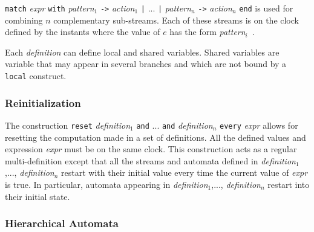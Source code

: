 \documentclass[11pt,titlepage,twoside]{report}
\newcommand{\And}{\mbox{{\tt and}}}
\renewcommand{\Reset}{\mbox{{\tt reset}}}
\newcommand{\Every}{\mbox{{\tt every}}}
\newcommand{\term}[1]{{\tt #1}}
\newcommand{\nterm}[1]{{\em #1}}
\begin{document}
\term{match} \nterm{expr} \term{with} \nterm{pattern}$_1$ \term{->}
\nterm{action}$_1$ \term{|} ... \term{|} \nterm{pattern}$_n$ \term{->}
\nterm{action}$_n$ \term{end} is used for combining $n$ complementary
sub-streams. Each of these streams is on the clock defined by the
instants where the value of $e$ has the form \nterm{pattern}$_i$\ .

Each \nterm{definition} can define local and shared variables.
Shared variables are variable that may appear in several branches and
which are not bound by a \term{local} construct.

\subsubsection{Reinitialization}

The construction \term{\Reset} \nterm{definition}$_1$ \term{\And} ...
\term{\And} \nterm{definition}$_n$ \term{\Every} \nterm{expr} allows
for resetting the computation made in a set of definitions. All the
defined values and expression \nterm{expr} must be on the same
clock. This construction acts as a regular multi-definition except
that all the streams and automata defined in
\nterm{definition}$_1$,..., \nterm{definition}$_n$ restart with their
initial value every time the current value of {\em expr} is true. In
particular, automata appearing in \nterm{definition}$_1$,...,
\nterm{definition}$_n$ restart into their initial state.

\subsubsection{Hierarchical Automata}
\end{document}
